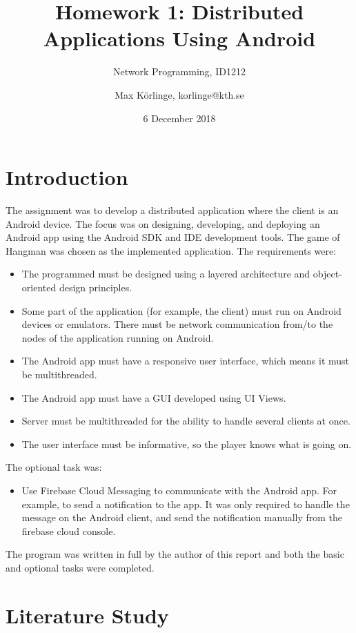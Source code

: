 \documentclass[a4paper]{scrartcl}
\title{Homework 1: Distributed Applications Using Android}
\subtitle{Network Programming, ID1212}
\author{Max Körlinge, korlinge@kth.se}
\date{6 December 2018}
\begin{document}
\maketitle


\section{Introduction}

\noindent The assignment was to develop a distributed application where the client is an Android device. The focus was on designing, developing, and deploying an Android app using the Android SDK and IDE development tools. The game of Hangman was chosen as the implemented application. The requirements were:

\begin{itemize}
    \item The programmed must be designed using a layered architecture and object-oriented design principles.
    \item Some part of the application (for example, the client) must run on Android devices or emulators. There must be network communication from/to the nodes of the application running on Android.
    \item The Android app must have a responsive user interface, which means it must be multithreaded.
    \item The Android app must have a GUI developed using UI Views.
    \item Server must be multithreaded for the ability to handle several clients at once.
    \item The user interface must be informative, so the player knows what is going on.
\end{itemize}

The optional task was:

\begin{itemize}
    \item Use Firebase Cloud Messaging to communicate with the Android app. For example, to send a notification to the app. It was only required to handle the message on the Android client, and send the notification manually from the firebase cloud console.
\end{itemize}

The program was written in full by the author of this report and both the basic and optional tasks were completed.

\section{Literature Study}
\end{document}
